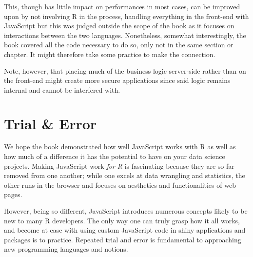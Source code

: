 \documentclass[
  10pt,
]{krantz}
\makeatletter
\newenvironment{Shaded}{\begin{snugshade}}{\end{snugshade}}
\newcommand{\AttributeTok}[1]{\textcolor[rgb]{0.61,0.61,0.61}{#1}}
\newcommand{\CommentTok}[1]{\textcolor[rgb]{0.37,0.37,0.37}{\textit{#1}}}
\newcommand{\KeywordTok}[1]{\textcolor[rgb]{0.27,0.27,0.27}{\textbf{#1}}}
\newcommand{\NormalTok}[1]{#1}
\newcommand{\OperatorTok}[1]{\textcolor[rgb]{0.43,0.43,0.43}{\textbf{#1}}}
\newcommand{\StringTok}[1]{\textcolor[rgb]{0.5,0.5,0.5}{#1}}
\newenvironment{kframe}{%
\medskip{}
\setlength{\fboxsep}{.8em}
 \def\at@end@of@kframe{}%
 \ifinner\ifhmode%
  \def\at@end@of@kframe{\end{minipage}}%
  \begin{minipage}{\columnwidth}%
 \fi\fi%
 \def\FrameCommand##1{\hskip\@totalleftmargin \hskip-\fboxsep
 \colorbox{shadecolor}{##1}\hskip-\fboxsep
     \hskip-\linewidth \hskip-\@totalleftmargin \hskip\columnwidth}%
 \MakeFramed {\advance\hsize-\width
   \@totalleftmargin\z@ \linewidth\hsize
   \@setminipage}}%
 {\par\unskip\endMakeFramed%
 \at@end@of@kframe}
\renewenvironment{Shaded}{\begin{kframe}}{\end{kframe}}
\makeatother
\begin{document}
This, though has little impact on performances in most cases, can be improved upon by not involving R in the process, handling everything in the front-end with JavaScript but this was judged outside the scope of the book as it focuses on interactions between the two languages. Nonetheless, somewhat interestingly, the book covered all the code necessary to do so, only not in the same section or chapter. It might therefore take some practice to make the connection.

\begin{Shaded}
\end{Shaded}

Note, however, that placing much of the business logic server-side rather than on the front-end might create more secure applications since said logic remains internal and cannot be interfered with.

\hypertarget{conclusion-trial-and-error}{%
\section{Trial \& Error}\label{conclusion-trial-and-error}}

We hope the book demonstrated how well JavaScript works with R as well as how much of a difference it has the potential to have on your data science projects. Making JavaScript work \emph{for R} is fascinating because they are so far removed from one another; while one excels at data wrangling and statistics, the other runs in the browser and focuses on aesthetics and functionalities of web pages.

However, being so different, JavaScript introduces numerous concepts likely to be new to many R developers. The only way one can truly grasp how it all works, and become at ease with using custom JavaScript code in shiny applications and packages is to practice. Repeated trial and error is fundamental to approaching new programming languages and notions.
\end{document}
